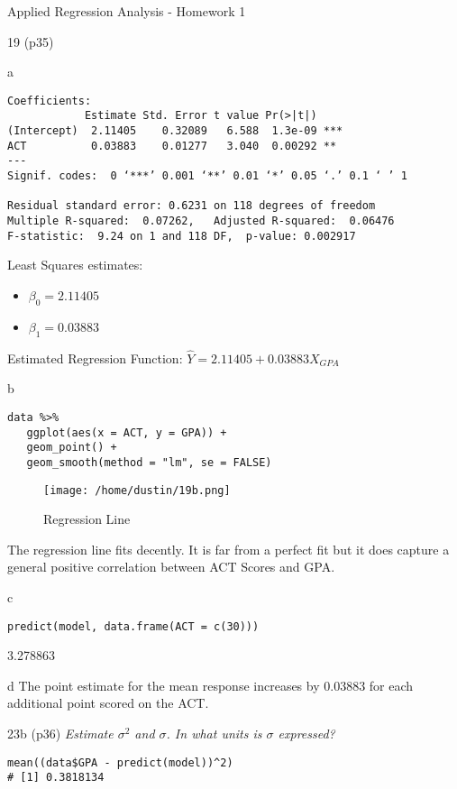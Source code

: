 \documentclass[11pt]{article}
\begin{document}
\begin{frame}[label={sec:orgb1fb7b8},fragile]{Applied Regression Analysis - Homework 1}
\begin{block}{19 (p35)}
\begin{block}{a}
\begin{verbatim}
Coefficients:
            Estimate Std. Error t value Pr(>|t|)    
(Intercept)  2.11405    0.32089   6.588  1.3e-09 ***
ACT          0.03883    0.01277   3.040  0.00292 ** 
---
Signif. codes:  0 ‘***’ 0.001 ‘**’ 0.01 ‘*’ 0.05 ‘.’ 0.1 ‘ ’ 1

Residual standard error: 0.6231 on 118 degrees of freedom
Multiple R-squared:  0.07262,	Adjusted R-squared:  0.06476 
F-statistic:  9.24 on 1 and 118 DF,  p-value: 0.002917
\end{verbatim}

Least Squares estimates:
\begin{itemize}
\item \(\beta_0 = 2.11405\)
\item \(\beta_1 = 0.03883\)
\end{itemize}

Estimated Regression Function: \(\hat{Y} = 2.11405 + 0.03883 X_{GPA}\)
\end{block}
\begin{block}{b}
\begin{verbatim}
data %>%
   ggplot(aes(x = ACT, y = GPA)) +
   geom_point() +
   geom_smooth(method = "lm", se = FALSE)
\end{verbatim}

\begin{figure}[htbp]
\centering
\texttt{[image: /home/dustin/19b.png]}
\caption{\label{fig:orgd07a152}
Regression Line}
\end{figure}

The regression line fits decently. It is far from a perfect fit but it does
capture a general positive correlation between ACT Scores and GPA.
\end{block}
\begin{block}{c}
\begin{verbatim}
predict(model, data.frame(ACT = c(30)))
\end{verbatim}

\alert{3.278863}
\end{block}
\begin{block}{d}
The point estimate for the mean response increases by 0.03883 for each
additional point scored on the ACT.
\end{block}
\end{block}

\begin{block}{23b (p36)}
\emph{Estimate \(\sigma^2\) and \(\sigma\). In what units is \(\sigma\) expressed?}

\begin{verbatim}
mean((data$GPA - predict(model))^2)
# [1] 0.3818134
\end{verbatim}


\end{block}
\end{frame}
\end{document}
